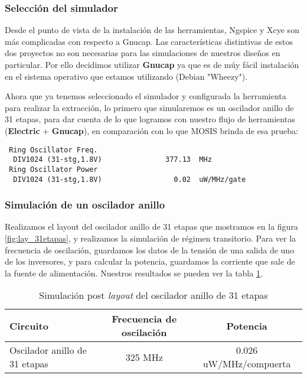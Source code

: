 \subsubsection{Selección del simulador}
Desde el punto de vista de la instalación de las herramientas, Ngspice y Xcye son más complicadas con respecto a Gnucap. Las características distintivas de estos dos proyectos no son necesarias para las simulaciones de nuestros diseños en particular. Por ello decidimos utilizar \textbf{Gnucap} ya que es de múy fácil instalación en el sistema operativo que estamos utilizando (Debian "Wheezy"). 

Ahora que ya tenemos seleccionado el simulador y configurada la herramienta para realizar la extracción, lo primero que simularemos es un oscilador anillo de 31 etapas, para dar cuenta de lo que logramos con nuestro flujo de herramientas (\textbf{Electric} + \textbf{Gnucap}), en comparación con lo que MOSIS brinda de esa prueba:

\begin{footnotesize}
\begin{verbatim}
 Ring Oscillator Freq.                                   
  DIV1024 (31-stg,1.8V)               377.13  MHz        
 Ring Oscillator Power                                   
  DIV1024 (31-stg,1.8V)                 0.02  uW/MHz/gate
\end{verbatim}
\end{footnotesize}

\subsubsection{Simulación de un oscilador anillo}
Realizamos el layout del oscilador anillo de 31 etapas que mostramos en la figura \ref{fig:lay_31etapas}, y realizamos la simulación de régimen transitorio. Para ver la frecuencia de oscilación, guardamos los datos de la tensión de una salida de uno de los inversores, y para calcular la potencia, guardamos la corriente que sale de la fuente de alimentación. Nuestros resultados se pueden ver la tabla \ref{tab:RO31}.

\begin{table}[h]
\vspace{0.3cm}
\centering
\begin{tabular}{@{}lcc@{}}
\toprule
Circuito	&	Frecuencia de oscilación	&	Potencia \\ \midrule
Oscilador anillo de 31 etapas               & 325 MHz	& 0.026 uW/MHz/compuerta   \\ \bottomrule
\end{tabular}
\caption{Simulación post \emph{layout} del oscilador anillo de 31 etapas}
\label{tab:RO31}
\end{table}

